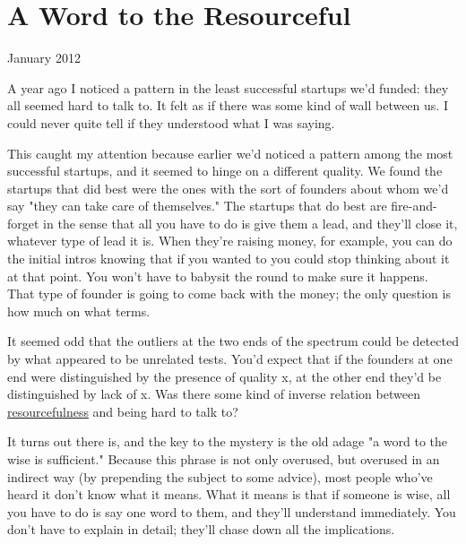\chapter{A Word to the Resourceful}


            
              
                


                  
                    January 2012

A year ago I noticed a pattern in
                    the least successful startups we'd funded: they all seemed
                    hard to talk to. It felt as if there was some kind of wall
                    between us. I could never quite tell if they understood what
                    I was saying.

This caught my attention because
                    earlier we'd noticed a pattern among the most successful
                    startups, and it seemed to hinge on a different quality. We
                    found the startups that did best were the ones with the sort
                    of founders about whom we'd say "they can take care of
                    themselves." The startups that do best are fire-and-forget
                    in the sense that all you have to do is give them a lead,
                    and they'll close it, whatever type of lead it is. When
                    they're raising money, for example, you can do the initial
                    intros knowing that if you wanted to you could stop thinking
                    about it at that point. You won't have to babysit the round
                    to make sure it happens. That type of founder is going to
                    come back with the money; the only question is how much on
                    what terms.

It seemed odd that the outliers at
                    the two ends of the spectrum could be detected by what
                    appeared to be unrelated tests. You'd expect that if the
                    founders at one end were distinguished by the presence of
                    quality x, at the other end they'd be distinguished by lack
                    of x. Was there some kind of inverse relation between
                    \href{http://www.paulgraham.com/relres.html}{resourcefulness} and being hard to
                    talk to?

It turns out there is, and the key to
                    the mystery is the old adage "a word to the wise is
                    sufficient." Because this phrase is not only overused, but
                    overused in an indirect way (by prepending the subject to
                    some advice), most people who've heard it don't know what it
                    means. What it means is that if someone is wise, all you
                    have to do is say one word to them, and they'll understand
                    immediately. You don't have to explain in detail; they'll
                    chase down all the implications.

